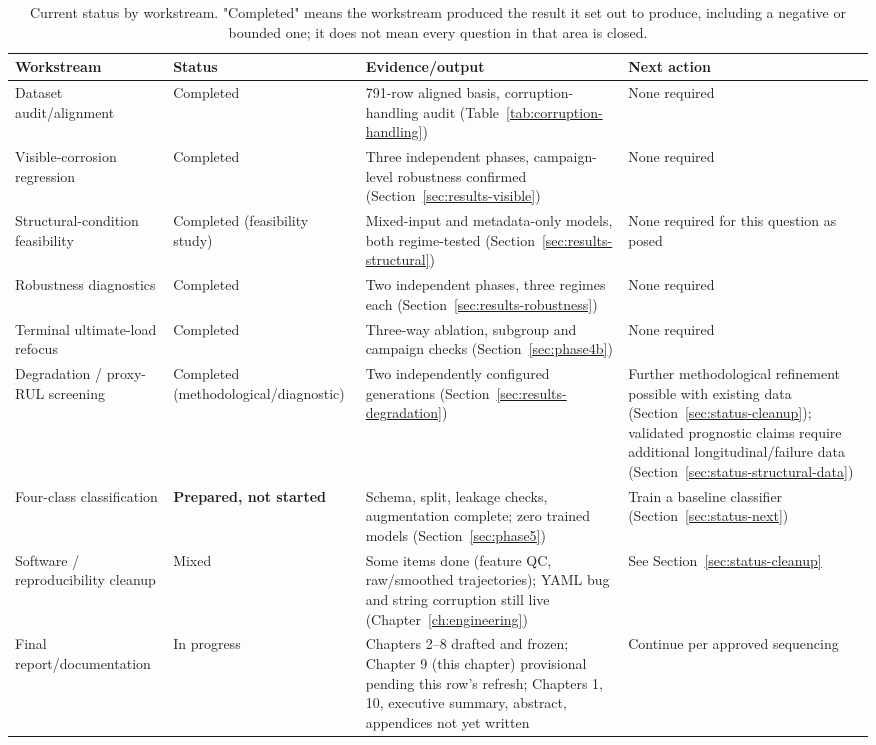 \begin{table}[htbp]
\centering
\caption{Current status by workstream. "Completed" means the workstream
produced the result it set out to produce, including a negative or bounded
one; it does not mean every question in that area is closed.}
\label{tab:status-summary}
\footnotesize
\begin{tabular}{p{3.0cm}p{2.0cm}p{4.6cm}p{3.4cm}}
\toprule
Workstream & Status & Evidence/output & Next action \\
\midrule
Dataset audit/alignment & Completed & 791-row aligned basis, corruption-handling audit (Table~\ref{tab:corruption-handling}) & None required \\
Visible-corrosion regression & Completed & Three independent phases, campaign-level robustness confirmed (Section~\ref{sec:results-visible}) & None required \\
Structural-condition feasibility & Completed (feasibility study) & Mixed-input and metadata-only models, both regime-tested (Section~\ref{sec:results-structural}) & None required for this question as posed \\
Robustness diagnostics & Completed & Two independent phases, three regimes each (Section~\ref{sec:results-robustness}) & None required \\
Terminal ultimate-load refocus & Completed & Three-way ablation, subgroup and campaign checks (Section~\ref{sec:phase4b}) & None required \\
Degradation / proxy-RUL screening & Completed (methodological/diagnostic) & Two independently configured generations (Section~\ref{sec:results-degradation}) & Further methodological refinement possible with existing data (Section~\ref{sec:status-cleanup}); validated prognostic claims require additional longitudinal/failure data (Section~\ref{sec:status-structural-data}) \\
Four-class classification & \textbf{Prepared, not started} & Schema, split, leakage checks, augmentation complete; zero trained models (Section~\ref{sec:phase5}) & Train a baseline classifier (Section~\ref{sec:status-next}) \\
Software / reproducibility cleanup & Mixed & Some items done (feature QC, raw/smoothed trajectories); YAML bug and string corruption still live (Chapter~\ref{ch:engineering}) & See Section~\ref{sec:status-cleanup} \\
Final report/documentation & In progress & Chapters 2--8 drafted and frozen; Chapter 9 (this chapter) provisional pending this row's refresh; Chapters 1, 10, executive summary, abstract, appendices not yet written & Continue per approved sequencing \\
\bottomrule
\end{tabular}
\end{table}

